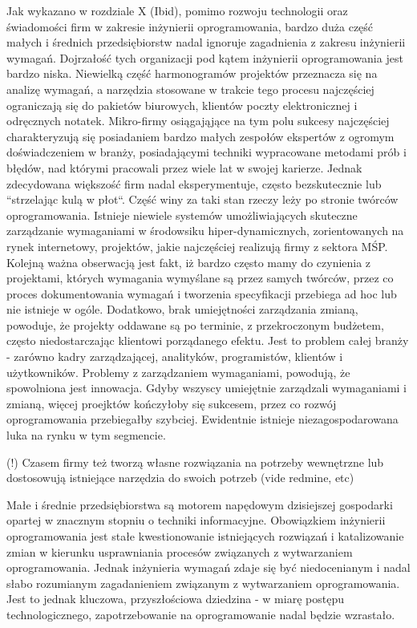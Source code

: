     Jak wykazano w rozdziale X (Ibid), pomimo rozwoju technologii oraz świadomości firm w zakresie inżynierii oprogramowania, bardzo duża część małych i średnich przedsiębiorstw nadal ignoruje zagadnienia z zakresu inżynierii wymagań. Dojrzałość tych organizacji pod kątem inżynierii oprogramowania jest bardzo niska. Niewielką część harmonogramów projektów przeznacza się na analizę wymagań, a narzędzia stosowane w trakcie tego procesu najczęściej ograniczają się do pakietów biurowych, klientów poczty elektronicznej i odręcznych notatek. Mikro-firmy osiągająjące na tym polu sukcesy najczęściej charakteryzują się posiadaniem bardzo małych zespołów ekspertów z ogromym doświadczeniem w branży, posiadającymi techniki wypracowane metodami prób i błędów, nad którymi pracowali przez wiele lat w swojej karierze.  Jednak zdecydowana większość firm nadal eksperymentuje, często bezskutecznie lub ``strzelając kulą w płot``. Część winy za taki stan rzeczy leży po stronie twórców oprogramowania. Istnieje niewiele systemów umożliwiających skuteczne zarządzanie wymaganiami w środowsiku hiper-dynamicznych, zorientowanych na rynek internetowy, projektów, jakie najczęściej realizują firmy z sektora MŚP. Kolejną ważna obserwacją jest fakt, iż bardzo często mamy do czynienia z projektami, których wymagania wymyślane są przez samych twórców, przez co proces dokumentowania wymagań i tworzenia specyfikacji przebiega ad hoc lub nie istnieje w ogóle. Dodatkowo, brak umiejętności zarządzania zmianą, powoduje, że projekty oddawane są po terminie, z przekroczonym budżetem, często niedostarczając klientowi porządanego efektu. Jest to problem całej branży - zarówno kadry zarządzającej, analityków, programistów, klientów i użytkowników. Problemy z zarządzaniem wymaganiami, powodują, że spowolniona jest innowacja. Gdyby wszyscy umiejętnie zarządzali wymaganiami i zmianą, więcej proejktów kończyłoby się sukcesem, przez co rozwój oprogramowania przebiegałby szybciej. Ewidentnie istnieje niezagospodarowana luka na rynku w tym segmencie. 

    (!) Czasem firmy też tworzą własne rozwiązania na potrzeby wewnętrzne lub dostosowują istniejące narzędzia do swoich potrzeb (vide redmine, etc)

    Małe i średnie przedsiębiorstwa są motorem napędowym dzisiejszej gospodarki opartej w znacznym stopniu o techniki informacyjne. Obowiązkiem inżynierii oprogramowania jest stałe kwestionowanie istniejących rozwiązań i katalizowanie zmian w kierunku usprawniania procesów związanych z wytwarzaniem oprogramowania. Jednak inżynieria wymagań zdaje się być niedocenianym i nadal słabo rozumianym zagadanieniem związanym z wytwarzaniem oprogramowania. Jest to jednak kluczowa, przyszłościowa dziedzina - w miarę postępu technologicznego, zapotrzebowanie na oprogramowanie nadal będzie wzrastało.

